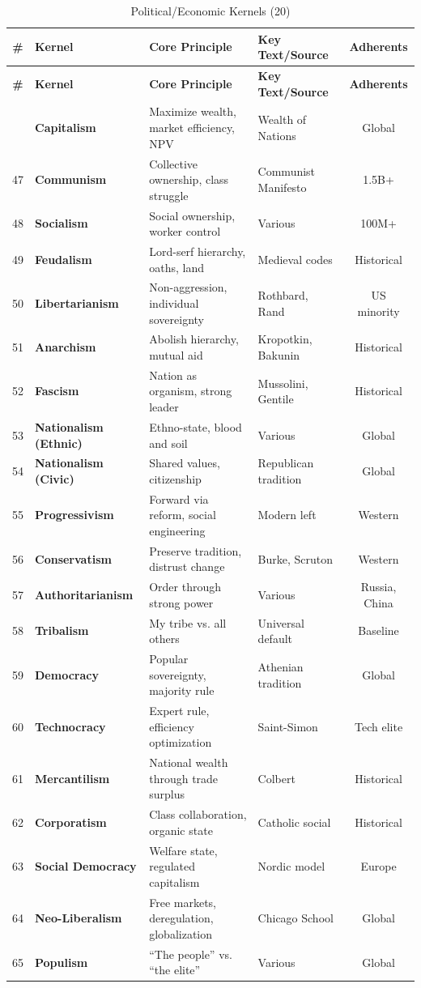 \documentclass[11pt,a4paper]{article}
\theoremstyle{definition}
\theoremstyle{remark}
\begin{document}
\begin{longtable}{@{}clp{4cm}p{3.5cm}c@{}}
\caption{Political/Economic Kernels (20)} \label{tab:political-kernels} \\
\toprule
\textbf{\#} & \textbf{Kernel} & \textbf{Core Principle} & \textbf{Key Text/Source} & \textbf{Adherents} \\
\midrule
\endfirsthead
\toprule
\textbf{\#} & \textbf{Kernel} & \textbf{Core Principle} & \textbf{Key Text/Source} & \textbf{Adherents} \\
\midrule
\endhead
\bottomrule
\endlastfoot
46 & \textbf{Capitalism} & Maximize wealth, market efficiency, NPV & Wealth of Nations & Global \\
47 & \textbf{Communism} & Collective ownership, class struggle & Communist Manifesto & 1.5B+ \\
48 & \textbf{Socialism} & Social ownership, worker control & Various & 100M+ \\
49 & \textbf{Feudalism} & Lord-serf hierarchy, oaths, land & Medieval codes & Historical \\
50 & \textbf{Libertarianism} & Non-aggression, individual sovereignty & Rothbard, Rand & US minority \\
51 & \textbf{Anarchism} & Abolish hierarchy, mutual aid & Kropotkin, Bakunin & Historical \\
52 & \textbf{Fascism} & Nation as organism, strong leader & Mussolini, Gentile & Historical \\
53 & \textbf{Nationalism (Ethnic)} & Ethno-state, blood and soil & Various & Global \\
54 & \textbf{Nationalism (Civic)} & Shared values, citizenship & Republican tradition & Global \\
55 & \textbf{Progressivism} & Forward via reform, social engineering & Modern left & Western \\
56 & \textbf{Conservatism} & Preserve tradition, distrust change & Burke, Scruton & Western \\
57 & \textbf{Authoritarianism} & Order through strong power & Various & Russia, China \\
58 & \textbf{Tribalism} & My tribe vs. all others & Universal default & Baseline \\
59 & \textbf{Democracy} & Popular sovereignty, majority rule & Athenian tradition & Global \\
60 & \textbf{Technocracy} & Expert rule, efficiency optimization & Saint-Simon & Tech elite \\
61 & \textbf{Mercantilism} & National wealth through trade surplus & Colbert & Historical \\
62 & \textbf{Corporatism} & Class collaboration, organic state & Catholic social & Historical \\
63 & \textbf{Social Democracy} & Welfare state, regulated capitalism & Nordic model & Europe \\
64 & \textbf{Neo-Liberalism} & Free markets, deregulation, globalization & Chicago School & Global \\
65 & \textbf{Populism} & ``The people'' vs. ``the elite'' & Various & Global \\
\end{longtable}
\end{document}
